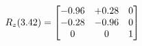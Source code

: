 \documentclass[preview]{standalone}
\begin{document}
\begin{align*}
\special{dvisvgm:raw <g id='unique000'>}R_{z}(3.42) = \begin{bmatrix}-0.96 & +0.28 & 0 \\-0.28 & -0.96 & 0 \\0 & 0 & 1\end{bmatrix}\special{dvisvgm:raw </g>}
\end{align*}
\end{document}
